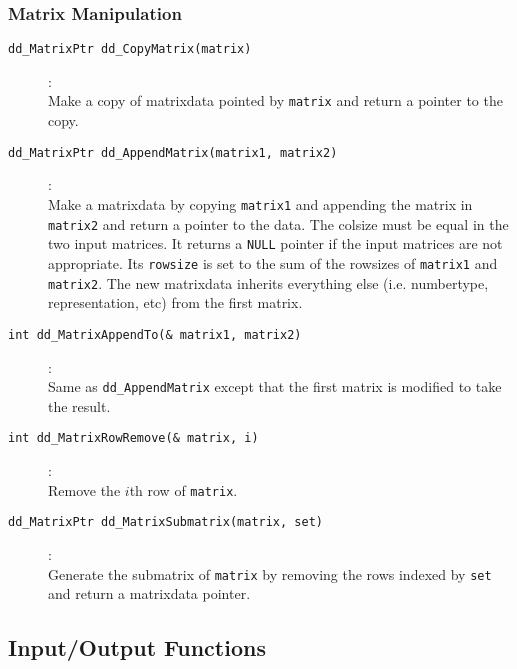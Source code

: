 \documentclass[11pt]{article}
\newcommand {\0} {{\bf 0}}
\begin{document}
\subsubsection{Matrix Manipulation}
\begin{description}

\item[{\tt dd\_MatrixPtr dd\_CopyMatrix(matrix)}]:\\
Make a copy of matrixdata pointed by {\tt matrix} and return
a pointer to the copy.

\item[{\tt dd\_MatrixPtr dd\_AppendMatrix(matrix1, matrix2)}]:\\
Make a matrixdata by copying {\tt *matrix1} and appending
the matrix in {\tt *matrix2} and return
a pointer to the data.  The colsize must be equal in
the two input matrices.  It returns a {\tt NULL} pointer
if the input matrices are not appropriate.
Its {\tt rowsize} is set to
the sum of the rowsizes of {\tt matrix1} and {\tt matrix2}.
 The new matrixdata inherits everything else
(i.e. numbertype, representation, etc)
from the first matrix. 

\item[{\tt int dd\_MatrixAppendTo(\& matrix1, matrix2)}]:\\
Same as {\tt dd\_AppendMatrix} except that the first matrix
is modified to take the result.

\item[{\tt int dd\_MatrixRowRemove(\& matrix, i)}]:\\
Remove the $i$th row of {\tt matrix}.

\item[{\tt dd\_MatrixPtr dd\_MatrixSubmatrix(matrix, set)}]:\\
Generate the submatrix of {\tt matrix} by removing the
rows indexed by {\tt set} and return a matrixdata pointer.

\end{description}

\subsection{Input/Output Functions}  \label{IOLibrary}
\end{document}
